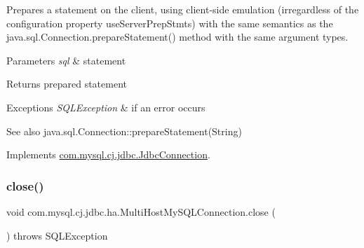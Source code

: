 Prepares a statement on the client, using client-\/side emulation (irregardless of the configuration property \textquotesingle{}use\+Server\+Prep\+Stmts\textquotesingle{}) with the same semantics as the java.\+sql.\+Connection.\+prepare\+Statement() method with the same argument types.


\begin{DoxyParams}{Parameters}
{\em sql} & statement \\
\hline
\end{DoxyParams}
\begin{DoxyReturn}{Returns}
prepared statement 
\end{DoxyReturn}

\begin{DoxyExceptions}{Exceptions}
{\em S\+Q\+L\+Exception} & if an error occurs \\
\hline
\end{DoxyExceptions}
\begin{DoxySeeAlso}{See also}
java.\+sql.\+Connection\+::prepare\+Statement(\+String) 
\end{DoxySeeAlso}


Implements \mbox{\hyperlink{interfacecom_1_1mysql_1_1cj_1_1jdbc_1_1_jdbc_connection_a62db1ccf7a070833775481acb5e9e359}{com.\+mysql.\+cj.\+jdbc.\+Jdbc\+Connection}}.

\mbox{\label{classcom_1_1mysql_1_1cj_1_1jdbc_1_1ha_1_1_multi_host_my_s_q_l_connection_a395d1a2ad3c87af7cc97a6a516b601f2}} 
\subsubsection{\texorpdfstring{close()}{close()}}
{\footnotesize\ttfamily void com.\+mysql.\+cj.\+jdbc.\+ha.\+Multi\+Host\+My\+S\+Q\+L\+Connection.\+close (\begin{DoxyParamCaption}{ }\end{DoxyParamCaption}) throws S\+Q\+L\+Exception}

\mbox{\label{classcom_1_1mysql_1_1cj_1_1jdbc_1_1ha_1_1_multi_host_my_s_q_l_connection_a789df6249664b46fe3142bc4d981b046}} 
